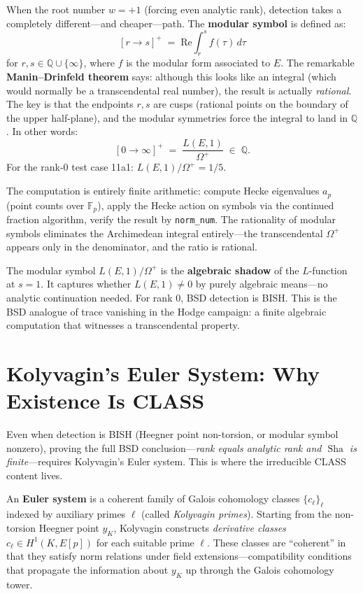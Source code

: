 \documentclass[11pt,twoside,openany]{report}
\theoremstyle{remark}
\newcommand{\BISH}{\textsf{BISH}}
\newcommand{\CLASS}{\textsf{CLASS}}
\DeclareMathOperator{\Sha}{Sha}
\begin{document}
When the root number $w = +1$ (forcing even analytic rank), detection takes a completely different---and cheaper---path. The \textbf{modular symbol} is defined as:
\[
  [r \to s]^+ \;=\; \mathrm{Re}\!\int_r^s f(\tau)\, d\tau
\]
for $r, s \in \mathbb{Q} \cup \{\infty\}$, where $f$ is the modular form associated to $E$. The remarkable \textbf{Manin--Drinfeld theorem} says: although this looks like an integral (which would normally be a transcendental real number), the result is actually \emph{rational}. The key is that the endpoints $r, s$ are cusps (rational points on the boundary of the upper half-plane), and the modular symmetries force the integral to land in $\mathbb{Q}$. In other words:
\[
  [0 \to \infty]^+ \;=\; \frac{L(E,1)}{\Omega^+} \;\in\; \mathbb{Q}.
\]
For the rank-0 test case 11a1: $L(E,1)/\Omega^+ = 1/5$.

The computation is entirely finite arithmetic: compute Hecke eigenvalues $a_p$ (point counts over $\mathbb{F}_p$), apply the Hecke action on symbols via the continued fraction algorithm, verify the result by \texttt{norm\_num}. The rationality of modular symbols eliminates the Archimedean integral entirely---the transcendental $\Omega^+$ appears only in the denominator, and the ratio is rational.

\begin{thesisbox}
The modular symbol $L(E,1)/\Omega^+$ is the \textbf{algebraic shadow} of the $L$-function at $s = 1$. It captures whether $L(E,1) \neq 0$ by purely algebraic means---no analytic continuation needed. For rank 0, BSD detection is \BISH. This is the BSD analogue of trace vanishing in the Hodge campaign: a finite algebraic computation that witnesses a transcendental property.
\end{thesisbox}


\section{Kolyvagin's Euler System: Why Existence Is CLASS}

Even when detection is \BISH{} (Heegner point non-torsion, or modular symbol nonzero), proving the full BSD conclusion---\emph{rank equals analytic rank and $\Sha$ is finite}---requires Kolyvagin's Euler system. This is where the irreducible \CLASS{} content lives.

An \textbf{Euler system} is a coherent family of Galois cohomology classes $\{c_\ell\}_\ell$ indexed by auxiliary primes $\ell$ (called \emph{Kolyvagin primes}). Starting from the non-torsion Heegner point $y_K$, Kolyvagin constructs \emph{derivative classes} $c_\ell \in H^1(K, E[p])$ for each suitable prime $\ell$. These classes are ``coherent'' in that they satisfy norm relations under field extensions---compatibility conditions that propagate the information about $y_K$ up through the Galois cohomology tower.
\end{document}
